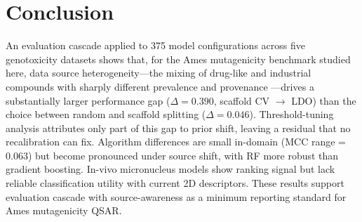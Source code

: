 \section{Conclusion}

An evaluation cascade applied to 375 model configurations across five genotoxicity datasets shows that, 
for the Ames mutagenicity benchmark studied here, data source heterogeneity---the mixing of drug-like and industrial compounds with sharply different prevalence and provenance
---drives a substantially larger performance gap ($\Delta = 0.390$, scaffold CV $\to$ LDO) than the choice between random and scaffold splitting ($\Delta = 0.046$). 
Threshold-tuning analysis attributes only part of this gap to prior shift, leaving a residual that no recalibration can fix. Algorithm differences are small in-domain (MCC range = 0.063) 
but become pronounced under source shift, with RF more robust than gradient boosting. 
In-vivo micronucleus models show ranking signal but lack reliable classification utility with current 2D descriptors. 
These results support evaluation cascade with source-awareness as a minimum reporting standard for Ames mutagenicity QSAR.
